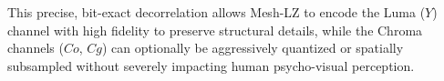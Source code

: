 This precise, bit-exact decorrelation allows Mesh-LZ to encode the Luma ($Y$) channel with high fidelity to preserve structural details, while the Chroma channels ($Co$, $Cg$) can optionally be aggressively quantized or spatially subsampled without severely impacting human psycho-visual perception.
